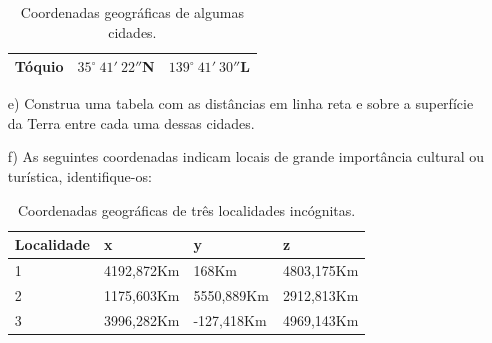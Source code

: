 \begin{exer}
\begin{itemize}
\begin{table}[h]
\begin{tabular}{|l|l|l|}
  	\hline
  	Tóquio & $35^\circ~ 41{'}~22{''}$N & $139^\circ ~41{'}~30{''}$L\\
  	\hline
		\end{tabular}
	\caption{Coordenadas geográficas de algumas cidades.}
	\label{tabcidades}
\end{table}
\item[e)] Construa uma tabela com as distâncias em linha reta e sobre a superfície da Terra entre cada uma dessas cidades.
\item[f)] As seguintes coordenadas indicam locais de grande importância cultural ou turística, identifique-os:
\begin{table}[htp]
	\centering
		\begin{tabular}{|l|l|l|l|}
		\hline
Localidade &	  x & y & z\\
		\hline
1&		4192,872Km & 168Km & 4803,175Km\\
		\hline
2&		1175,603Km&	5550,889Km&	2912,813Km\\
		\hline
3&   3996,282Km&	-127,418Km&	4969,143Km\\
  	\hline
		\end{tabular}
	\caption{Coordenadas geográficas de três localidades incógnitas.}
	\label{tabmonumentos}
\end{table}
\end{itemize}
\end{exer}


%





